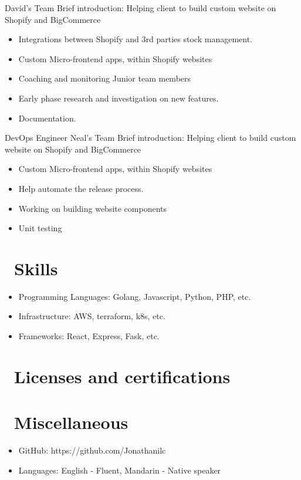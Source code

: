 \documentclass{resume}
\begin{document}
 {David's Team}
Brief introduction: Helping client to build custom website on Shopify and BigCommerce
\begin{itemize}
  \item Integrations between Shopify and 3rd parties stock management.
  \item Custom Micro-frontend apps, within Shopify websites
  \item Coaching and monitoring Junior team members
  \item Early phase research and investigation on new features.
  \item Documentation.
\end{itemize}

 {DevOps Engineer} {Neal's Team}
Brief introduction: Helping client to build custom website on Shopify and BigCommerce
\begin{itemize}
  \item Custom Micro-frontend apps, within Shopify websites
  \item Help automate the release process.
  \item Working on building website components
  \item Unit testing
\end{itemize}

\section{\faCogs\ Skills}
\begin{itemize}[parsep=0.5ex]
  \item Programming Languages: Golang, Javascript, Python, PHP, etc.
  \item Infrastructure: AWS, terraform, k8s, etc.
  \item Frameworks: React, Express, Fask, etc.
\end{itemize}

\section{\faHeartO\ Licenses and certifications}

\section{\faInfo\ Miscellaneous}
\begin{itemize}[parsep=0.5ex]
  \item GitHub: https://github.com/Jonathanilc
  \item Languages: English - Fluent, Mandarin - Native speaker
\end{itemize}

%
%
\end{document}
